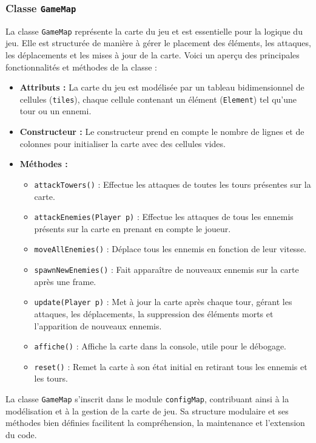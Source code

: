 \documentclass{article}
\begin{document}
\subsubsection*{Classe \texttt{GameMap}}
La classe \texttt{GameMap} représente la carte du jeu et est essentielle pour la logique du jeu. Elle est structurée de manière à gérer le placement des éléments, les attaques, les déplacements et les mises à jour de la carte. Voici un aperçu des principales fonctionnalités et méthodes de la classe :

\begin{itemize}
    \item \textbf{Attributs :} La carte du jeu est modélisée par un tableau bidimensionnel de cellules (\texttt{tiles}), chaque cellule contenant un élément (\texttt{Element}) tel qu'une tour ou un ennemi.

    \item \textbf{Constructeur :} Le constructeur prend en compte le nombre de lignes et de colonnes pour initialiser la carte avec des cellules vides.

    \item \textbf{Méthodes :}
    \begin{itemize}
        \item \texttt{attackTowers()} : Effectue les attaques de toutes les tours présentes sur la carte.
        \item \texttt{attackEnemies(Player p)} : Effectue les attaques de tous les ennemis présents sur la carte en prenant en compte le joueur.
        \item \texttt{moveAllEnemies()} : Déplace tous les ennemis en fonction de leur vitesse.
        \item \texttt{spawnNewEnemies()} : Fait apparaître de nouveaux ennemis sur la carte après une frame.
        \item \texttt{update(Player p)} : Met à jour la carte après chaque tour, gérant les attaques, les déplacements, la suppression des éléments morts et l'apparition de nouveaux ennemis.
        \item \texttt{affiche()} : Affiche la carte dans la console, utile pour le débogage.
        \item \texttt{reset()} : Remet la carte à son état initial en retirant tous les ennemis et les tours.
    \end{itemize}
\end{itemize}

La classe \texttt{GameMap} s'inscrit dans le module \texttt{configMap}, contribuant ainsi à la modélisation et à la gestion de la carte de jeu. Sa structure modulaire et ses méthodes bien définies facilitent la compréhension, la maintenance et l'extension du code.
\end{document}
